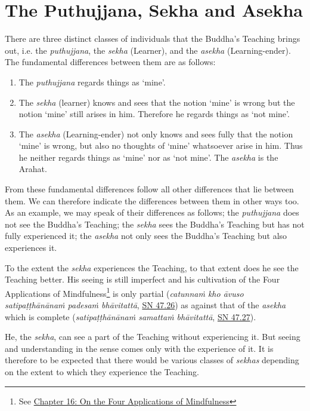 \chapter{The Puthujjana, Sekha and Asekha}

There are three distinct classes of individuals that the Buddha's Teaching brings out, i.e. the \emph{puthujjana}, the \emph{sekha} (Learner), and the \emph{asekha} (Learning-ender). The fundamental differences between them are as follows:

\begin{enumerate}
\item
  The \emph{puthujjana} regards things as `mine'.
\item
  The \emph{sekha} (learner) knows and sees that the notion `mine' is wrong but the notion `mine' still arises in him. Therefore he regards things as `not mine'.
\item
  The \emph{asekha} (Learning-ender) not only knows and sees fully that the notion `mine' is wrong, but also no thoughts of `mine' whatsoever arise in him. Thus he neither regards things as `mine' nor as `not mine'. The \emph{asekha} is the Arahat.
\end{enumerate}

From these fundamental differences follow all other differences that lie between them. We can therefore indicate the differences between them in other ways too. As an example, we may speak of their differences as follows; the \emph{puthujjana} does not see the Buddha's Teaching; the \emph{sekha} sees the Buddha's Teaching but has not fully experienced it; the \emph{asekha} not only sees the Buddha's Teaching but also  experiences it.

To the extent the \emph{sekha} experiences the Teaching, to that extent does he see the Teaching better. His seeing is still imperfect and his cultivation of the Four Applications of Mindfulness\footnote{See \href{ch-16-satipatthana.xml\#start}{Chapter 16: On the Four Applications of Mindfulness}} is only partial (\emph{catunnaṁ kho āvuso satipaṭṭhānānaṁ padesaṁ bhāvitattā}, \href{https://suttacentral.net/sn47.26/en/bodhi}{SN 47.26}) as against that of the \emph{asekha} which is complete (\emph{satipaṭṭhānānaṁ samattaṁ bhāvitattā}, \href{https://suttacentral.net/sn47.27/en/bodhi}{SN 47.27}).

He, the \emph{sekha}, can see a part of the Teaching without experiencing it. But seeing and understanding in the  sense comes only with the experience of it. It is therefore to be expected that there would be various classes of \emph{sekhas} depending on the extent to which they experience the Teaching.

